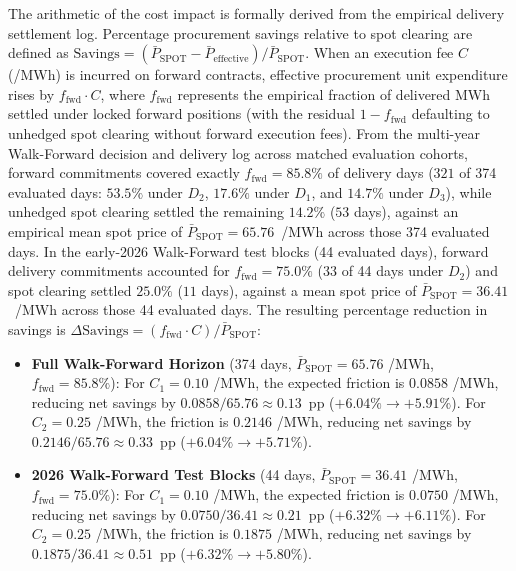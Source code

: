 The arithmetic of the cost impact is formally derived from the empirical delivery settlement log. Percentage procurement savings relative to spot clearing are defined as $\text{Savings} = (\bar{P}_{\text{SPOT}} - \bar{P}_{\text{effective}}) / \bar{P}_{\text{SPOT}}$. When an execution fee $C$ (\texteuro/MWh) is incurred on forward contracts, effective procurement unit expenditure rises by $f_{\text{fwd}} \cdot C$, where $f_{\text{fwd}}$ represents the empirical fraction of delivered MWh settled under locked forward positions (with the residual $1 - f_{\text{fwd}}$ defaulting to unhedged spot clearing without forward execution fees). From the multi-year Walk-Forward decision and delivery log across matched evaluation cohorts, forward commitments covered exactly $f_{\text{fwd}} = 85.8\%$ of delivery days ($321$ of 374 evaluated days: $53.5\%$ under $D_2$, $17.6\%$ under $D_1$, and $14.7\%$ under $D_3$), while unhedged spot clearing settled the remaining $14.2\%$ ($53$ days), against an empirical mean spot price of $\bar{P}_{\text{SPOT}} = 65.76$~\texteuro/MWh across those 374 evaluated days. In the early-2026 Walk-Forward test blocks (44 evaluated days), forward delivery commitments accounted for $f_{\text{fwd}} = 75.0\%$ ($33$ of 44 days under $D_2$) and spot clearing settled $25.0\%$ ($11$ days), against a mean spot price of $\bar{P}_{\text{SPOT}} = 36.41$~\texteuro/MWh across those 44 evaluated days. The resulting percentage reduction in savings is $\Delta \text{Savings} = (f_{\text{fwd}} \cdot C) / \bar{P}_{\text{SPOT}}$:
\begin{itemize}
    \item \textbf{Full Walk-Forward Horizon} (374 days, $\bar{P}_{\text{SPOT}} = 65.76$ \texteuro/MWh, $f_{\text{fwd}} = 85.8\%$): For $C_1 = 0.10$ \texteuro/MWh, the expected friction is $0.0858$ \texteuro/MWh, reducing net savings by $0.0858 / 65.76 \approx 0.13$~pp ($+6.04\% \to +5.91\%$). For $C_2 = 0.25$ \texteuro/MWh, the friction is $0.2146$ \texteuro/MWh, reducing net savings by $0.2146 / 65.76 \approx 0.33$~pp ($+6.04\% \to +5.71\%$).
    \item \textbf{2026 Walk-Forward Test Blocks} (44 days, $\bar{P}_{\text{SPOT}} = 36.41$ \texteuro/MWh, $f_{\text{fwd}} = 75.0\%$): For $C_1 = 0.10$ \texteuro/MWh, the expected friction is $0.0750$ \texteuro/MWh, reducing net savings by $0.0750 / 36.41 \approx 0.21$~pp ($+6.32\% \to +6.11\%$). For $C_2 = 0.25$ \texteuro/MWh, the friction is $0.1875$ \texteuro/MWh, reducing net savings by $0.1875 / 36.41 \approx 0.51$~pp ($+6.32\% \to +5.80\%$).
\end{itemize}

